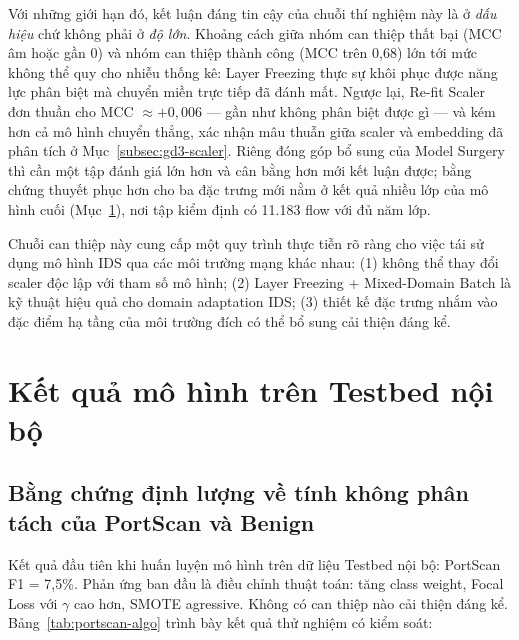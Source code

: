 \documentclass[../DoAn.tex]{subfiles}
\begin{document}
Với những giới hạn đó, kết luận đáng tin cậy của chuỗi thí nghiệm này là ở \textit{dấu hiệu} chứ không phải ở \textit{độ lớn}. Khoảng cách giữa nhóm can thiệp thất bại (MCC âm hoặc gần 0) và nhóm can thiệp thành công (MCC trên 0,68) lớn tới mức không thể quy cho nhiễu thống kê: Layer Freezing thực sự khôi phục được năng lực phân biệt mà chuyển miền trực tiếp đã đánh mất. Ngược lại, Re-fit Scaler đơn thuần cho MCC $\approx +0{,}006$ --- gần như không phân biệt được gì --- và kém hơn cả mô hình chuyển thẳng, xác nhận mâu thuẫn giữa scaler và embedding đã phân tích ở Mục~\ref{subsec:gd3-scaler}. Riêng đóng góp bổ sung của Model Surgery thì cần một tập đánh giá lớn hơn và cân bằng hơn mới kết luận được; bằng chứng thuyết phục hơn cho ba đặc trưng mới nằm ở kết quả nhiều lớp của mô hình cuối (Mục~\ref{sec:tn-testbed}), nơi tập kiểm định có 11.183 flow với đủ năm lớp.

Chuỗi can thiệp này cung cấp một quy trình thực tiễn rõ ràng cho việc tái sử dụng mô hình IDS qua các môi trường mạng khác nhau: (1) không thể thay đổi scaler độc lập với tham số mô hình; (2) Layer Freezing + Mixed-Domain Batch là kỹ thuật hiệu quả cho domain adaptation IDS; (3) thiết kế đặc trưng nhắm vào đặc điểm hạ tầng của môi trường đích có thể bổ sung cải thiện đáng kể.

\section{Kết quả mô hình trên Testbed nội bộ}
\label{sec:tn-testbed}

\subsection{Bằng chứng định lượng về tính không phân tách của PortScan và Benign}
\label{subsec:tn-testbed-portscan}

Kết quả đầu tiên khi huấn luyện mô hình trên dữ liệu Testbed nội bộ: PortScan F1 = 7,5\%. Phản ứng ban đầu là điều chỉnh thuật toán: tăng class weight, Focal Loss với $\gamma$ cao hơn, SMOTE agressive. Không có can thiệp nào cải thiện đáng kể. Bảng~\ref{tab:portscan-algo} trình bày kết quả thử nghiệm có kiểm soát:
\end{document}
